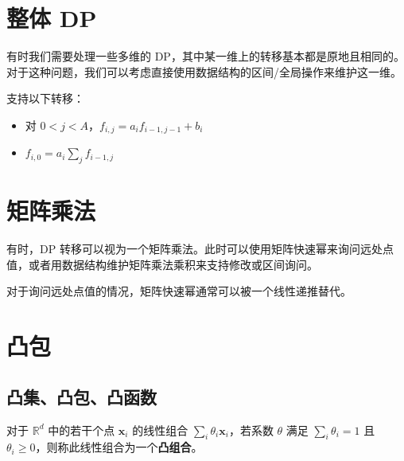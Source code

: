 \section{整体 DP}

有时我们需要处理一些多维的 DP，其中某一维上的转移基本都是原地且相同的。对于这种问题，我们可以考虑直接使用数据结构的区间/全局操作来维护这一维。

\begin{example}
    支持以下转移：
    \begin{itemize}
        \item 对 $0<j<A$，$f_{i,j}=a_if_{i-1,j-1}+b_i$
        \item $f_{i,0}=a_i\sum_j f_{i-1,j}$
    \end{itemize}
\end{example}

\begin{example}
    
\end{example}

\section{矩阵乘法}

有时，DP 转移可以视为一个矩阵乘法。此时可以使用矩阵快速幂来询问远处点值，或者用数据结构维护矩阵乘法乘积来支持修改或区间询问。
\begin{remark}
    对于询问远处点值的情况，矩阵快速幂通常可以被一个线性递推替代。
\end{remark}

\begin{example}[{P6772 [NOI2020] 美食家}]
    
\end{example}

\begin{example}[{P4719 【模板】动态 DP}]
    
\end{example}

\section{凸包}

\subsection{凸集、凸包、凸函数}

\begin{definition}[凸组合]
    对于 $\mathbb R^d$ 中的若干个点 $\mathbf x_i$ 的线性组合 $\sum_i \theta_i \mathbf x_i$，若系数 $\theta$ 满足 $\sum_i \theta_i=1$ 且 $\theta_i\ge 0$，则称此线性组合为一个\textbf{凸组合}。
\end{definition}

